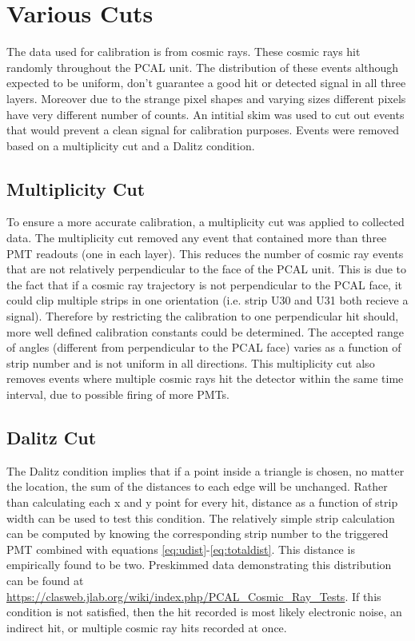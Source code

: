 \section{Various Cuts}
The data used for calibration is from cosmic rays. These cosmic rays hit randomly throughout the PCAL unit. 
The distribution of these events although expected to be uniform, don't guarantee a good hit or detected signal in all three layers.
Moreover due to the strange pixel shapes and varying sizes different pixels have very different number of counts. 
An intitial skim was used to cut out events that would prevent a clean signal for calibration purposes.
Events were removed based on a multiplicity cut and a Dalitz condition.



\FloatBarrier
\subsection{Multiplicity Cut}
To ensure a more accurate calibration, a multiplicity cut was applied to collected data. 
The multiplicity cut removed any event that contained more than three PMT readouts (one in each layer). 
This reduces the number of cosmic ray events that are not relatively perpendicular to the face of the PCAL unit.
This is due to the fact that if a cosmic ray trajectory is not perpendicular to the PCAL face, it could clip multiple strips in one orientation (i.e. strip U30 and U31 both recieve a signal). Therefore by restricting the calibration to one perpendicular hit should, more well defined calibration constants could be determined. 
The accepted range of angles (different from perpendicular to the PCAL face) varies as a function of strip number and is not uniform in all directions.
This multiplicity cut also removes events where multiple cosmic rays hit the detector within the same time interval, due to possible firing of more PMTs. 



 \FloatBarrier
\subsection{Dalitz Cut} 
The Dalitz condition implies that if a point inside a triangle is chosen, no matter the location, the sum of the distances to each edge will be unchanged.
Rather than calculating each x and y point for every hit, distance as a function of strip width can be used to test this condition.
The relatively simple strip calculation can be computed by knowing the corresponding strip number to the triggered PMT combined with equations \ref{eq:udist}-\ref{eq:totaldist}.
This distance is empirically found to be two.
Preskimmed data demonstrating this distribution can be found at \url{https://clasweb.jlab.org/wiki/index.php/PCAL_Cosmic_Ray_Tests}. 
If this condition is not satisfied, then the hit recorded is most likely electronic noise, an indirect hit, or multiple cosmic ray hits recorded at once.

